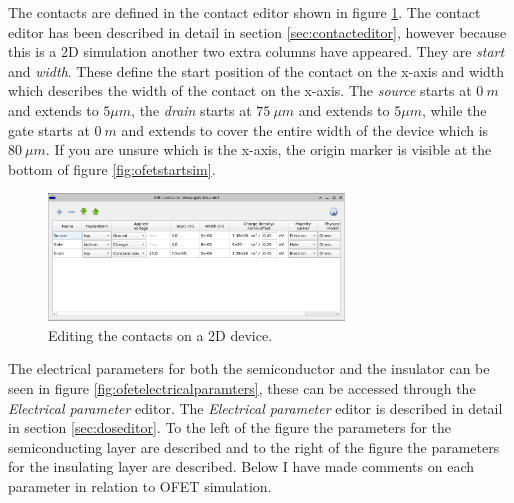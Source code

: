The contacts are defined in the contact editor shown in figure \ref{fig:ofetcontacteditor}. The contact editor has been described in detail in 
section \ref{sec:contacteditor}, however because this is a 2D simulation another two extra columns have appeared. They are \emph{start} and \emph{width}.  These define the start position of the contact on the x-axis and width which describes the width of the contact on the x-axis.  The \emph{source} starts at $0~m$ and extends to $5 \mu m$, the  \emph{drain} starts at $75~\mu m$ and extends to $5 \mu m$, while the gate starts at $0~m$ and extends to cover the entire width of the device which is $80~ \mu m$.  If you are unsure which is the x-axis, the origin marker is visible at the bottom of figure \ref{fig:ofetstartsim}.

\begin{figure}[H]
\centering
\includegraphics[width=0.7\textwidth]{./images/ofet_3.png}
\caption{Editing the contacts on a 2D device.}
\label{fig:ofetcontacteditor}
\end{figure}

The electrical parameters for both the semiconductor and the insulator can be seen in figure \ref{fig:ofetelectricalparamters}, these can be accessed through the \emph{Electrical parameter} editor. The \emph{Electrical parameter} editor is described in detail in section \ref{sec:doseditor}. To the left of the figure the parameters for the semiconducting layer are described and to the right of the figure the parameters for the insulating layer are described. Below I have made comments on each parameter in relation to OFET simulation.

